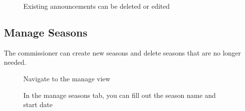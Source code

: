 \documentclass{article}
\begin{document}
\begin{figure}[H]
    \centering
    \caption{Existing announcements can be deleted or edited}
\end{figure}

\subsection{Manage Seasons}
The commissioner can create new seasons and delete seasons that are no longer needed.

\begin{figure}[H]
    \centering
    \caption{Navigate to the manage view}
\end{figure}

\begin{figure}[H]
    \centering
    \caption{In the manage seasons tab, you can fill out the season name and start date}
\end{figure}
\end{document}
